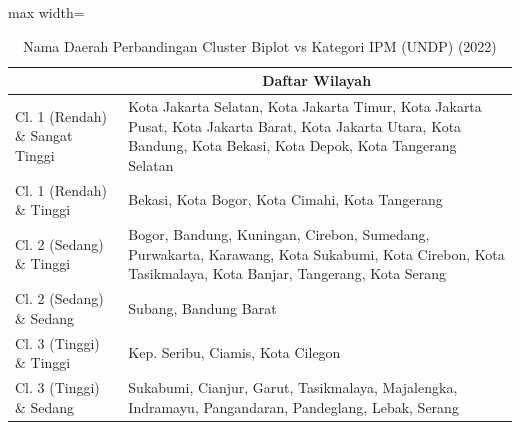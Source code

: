 \begin{table}[H]
\centering
\caption{Nama Daerah Perbandingan Cluster Biplot vs Kategori IPM (UNDP) (2022)} \label{tab:app2crossname2022}
\begin{adjustbox}{max width=\textwidth}
\begin{tabular}{|>{\centering\arraybackslash}p{4cm}|p{10cm}|}
\hline
\multicolumn{1}{|c|}{\textbf{Kategori}} & \multicolumn{1}{c|}{\textbf{Daftar Wilayah}} \\
\hline
Cl. 1 (Rendah) \& Sangat Tinggi & Kota Jakarta Selatan, Kota Jakarta Timur, Kota Jakarta Pusat, Kota Jakarta Barat, Kota Jakarta Utara, Kota Bandung, Kota Bekasi, Kota Depok, Kota Tangerang Selatan \\
\hline
Cl. 1 (Rendah) \& Tinggi & Bekasi, Kota Bogor, Kota Cimahi, Kota Tangerang \\
\hline
Cl. 2 (Sedang) \& Tinggi & Bogor, Bandung, Kuningan, Cirebon, Sumedang, Purwakarta, Karawang, Kota Sukabumi, Kota Cirebon, Kota Tasikmalaya, Kota Banjar, Tangerang, Kota Serang \\
\hline
Cl. 2 (Sedang) \& Sedang & Subang, Bandung Barat \\
\hline
Cl. 3 (Tinggi) \& Tinggi & Kep. Seribu, Ciamis, Kota Cilegon \\
\hline
Cl. 3 (Tinggi) \& Sedang & Sukabumi, Cianjur, Garut, Tasikmalaya, Majalengka, Indramayu, Pangandaran, Pandeglang, Lebak, Serang \\
\hline
\end{tabular}
\end{adjustbox}
\end{table}
